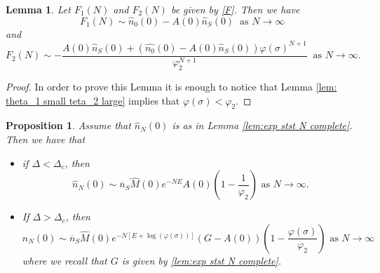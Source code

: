 \documentclass{article}
\numberwithin{equation}{section}
\theoremstyle{plain}
\newtheorem{lemma}[theorem]{Lemma}
\newtheorem{proposition}[theorem]{Proposition}
\begin{document}
\begin{lemma} \label{lem:asympt F1}
Let $F_1(N) $ and $F_2(N) $ be given by \eqref{F}. Then we have \[ F_1(N) \sim \hat{n}_0 (0) - A(0)\hat{n}_S(0) \  \text{ as } N \to \infty \] and
\[
F_2(N) \sim - \frac{ A(0) \hat{n}_S(0) + (\hat{n_0} (0) - A(0)\hat{n}_S(0) ) \varphi(\sigma)^{N+1}}{\varphi_2^{N+1}} \ \text{ as } N \to \infty. 
\]   
\end{lemma}
\begin{proof}
In order to prove this Lemma it is enough to notice that Lemma \ref{lem: theta_1 small teta_2 large} implies that $\varphi(\sigma) < \varphi_2$.
\end{proof}
\begin{proposition}
Assume that $\hat{n}_N (0) $ is as in Lemma \ref{lem:exp stst N complete}. Then we have that 
\begin{itemize}
\item if $\Delta < \Delta_c $, then 
\[
 \hat{n}_N (0) \sim \overline{n}_S \hat{M}(0) e^{- N E }  A(0) \left( 1- \frac{1}{\varphi_2 }\right)   \text{ as } N \to \infty. 
 \]   
 \item If $\Delta >\Delta_c $, then 
 \[
      \hat{n}_N (0) \sim \overline{n}_S \hat{M}(0) e^{- N [E + \log(\varphi(\sigma) ) ] }   (G- A(0) ) \left( 1- \frac{\varphi(\sigma ) }{ \varphi_2}\right)   \text{ as } N \to \infty
 \]
where we recall that $G $ is given by \eqref{lem:exp stst N complete}. 
 \end{itemize}

\end{proposition}
\end{document}
